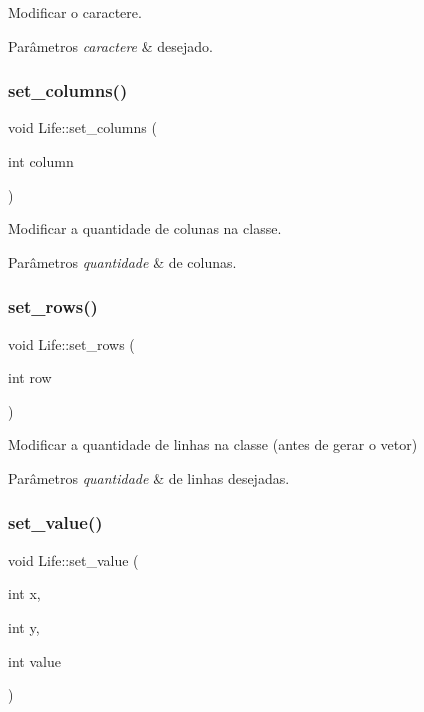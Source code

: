 Modificar o caractere. 
\begin{DoxyParams}{Parâmetros}
{\em caractere} & desejado. \\
\hline
\end{DoxyParams}
\mbox{\label{classLife_a62931743c6915fecee04b7a613d724be}} 
\subsubsection{\texorpdfstring{set\+\_\+columns()}{set\_columns()}}
{\footnotesize\ttfamily void Life\+::set\+\_\+columns (\begin{DoxyParamCaption}\item[{int}]{column }\end{DoxyParamCaption})}

Modificar a quantidade de colunas na classe. 
\begin{DoxyParams}{Parâmetros}
{\em quantidade} & de colunas. \\
\hline
\end{DoxyParams}
\mbox{\label{classLife_a2a76d59604c348b77e49af72a099ba31}} 
\subsubsection{\texorpdfstring{set\+\_\+rows()}{set\_rows()}}
{\footnotesize\ttfamily void Life\+::set\+\_\+rows (\begin{DoxyParamCaption}\item[{int}]{row }\end{DoxyParamCaption})}

Modificar a quantidade de linhas na classe (antes de gerar o vetor) 
\begin{DoxyParams}{Parâmetros}
{\em quantidade} & de linhas desejadas. \\
\hline
\end{DoxyParams}
\mbox{\label{classLife_a9c560e37d0fdf23e908f5f6e2caf9eab}} 
\subsubsection{\texorpdfstring{set\+\_\+value()}{set\_value()}}
{\footnotesize\ttfamily void Life\+::set\+\_\+value (\begin{DoxyParamCaption}\item[{int}]{x,  }\item[{int}]{y,  }\item[{int}]{value }\end{DoxyParamCaption})}

